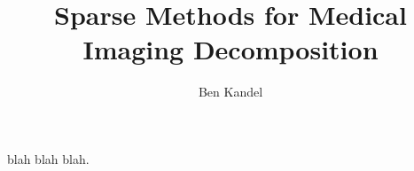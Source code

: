 \documentclass{nih}
\author{Ben Kandel}
\title{Sparse Methods for Medical Imaging Decomposition}
\begin{document}
\maketitle
blah blah blah. 
\end{document}
